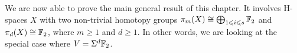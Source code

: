 
We are now able to prove the main general result of this chapter. It involves H-spaces $X$ with two non-trivial homotopy groups $\pi_m(X)\cong\bigoplus_{1\leqslant i\leqslant s}\mathbb{F}_2$ and $\pi_d(X)\cong\mathbb{F}_2$, where $m\geq1$ and $d\geq1$. In other words, we are looking at the special case where $V=\Sigma^d\mathbb{F}_2$.

\begin{thm_slight_gen}

\end{thm_slight_gen}

